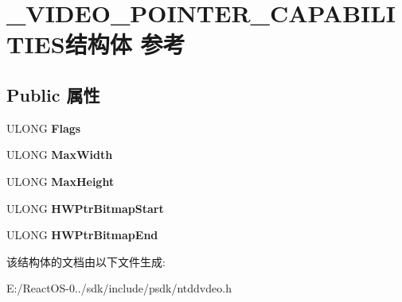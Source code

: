 \hypertarget{struct___v_i_d_e_o___p_o_i_n_t_e_r___c_a_p_a_b_i_l_i_t_i_e_s}{}\section{\+\_\+\+V\+I\+D\+E\+O\+\_\+\+P\+O\+I\+N\+T\+E\+R\+\_\+\+C\+A\+P\+A\+B\+I\+L\+I\+T\+I\+E\+S结构体 参考}
\label{struct___v_i_d_e_o___p_o_i_n_t_e_r___c_a_p_a_b_i_l_i_t_i_e_s}
\subsection*{Public 属性}
\begin{DoxyCompactItemize}
\item 
\mbox{\label{struct___v_i_d_e_o___p_o_i_n_t_e_r___c_a_p_a_b_i_l_i_t_i_e_s_a0855fd0f412061b1895b58c28524b432}} 
U\+L\+O\+NG {\bfseries Flags}
\item 
\mbox{\label{struct___v_i_d_e_o___p_o_i_n_t_e_r___c_a_p_a_b_i_l_i_t_i_e_s_acf823484d43e20afd06f84a5fd64de2e}} 
U\+L\+O\+NG {\bfseries Max\+Width}
\item 
\mbox{\label{struct___v_i_d_e_o___p_o_i_n_t_e_r___c_a_p_a_b_i_l_i_t_i_e_s_aed8a8876554c555e29041bf84b1a6eec}} 
U\+L\+O\+NG {\bfseries Max\+Height}
\item 
\mbox{\label{struct___v_i_d_e_o___p_o_i_n_t_e_r___c_a_p_a_b_i_l_i_t_i_e_s_a18b7c26cc18375c68aeac172f7ab724d}} 
U\+L\+O\+NG {\bfseries H\+W\+Ptr\+Bitmap\+Start}
\item 
\mbox{\label{struct___v_i_d_e_o___p_o_i_n_t_e_r___c_a_p_a_b_i_l_i_t_i_e_s_a81e37bde8314c19618c58636d2251ab5}} 
U\+L\+O\+NG {\bfseries H\+W\+Ptr\+Bitmap\+End}
\end{DoxyCompactItemize}


该结构体的文档由以下文件生成\+:\begin{DoxyCompactItemize}
\item 
E\+:/\+React\+O\+S-\/0../sdk/include/psdk/ntddvdeo.\+h\end{DoxyCompactItemize}
